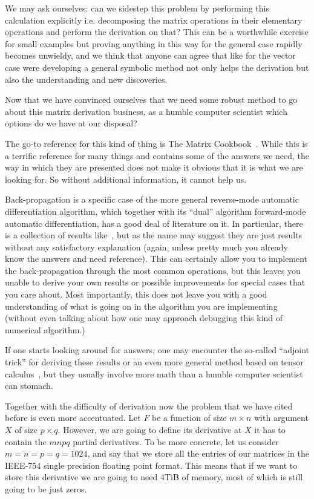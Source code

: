 \documentclass{sapthesis}
\begin{document}
We may ask ourselves: can we sidestep this problem by performing this
calculation explicitly i.e.  decomposing the matrix operations in their
elementary operations and perform the derivation on that? This can be a
worthwhile exercise for small examples but proving anything in this way for the
general case rapidly becomes unwieldy, and we think that anyone can agree that
like for the vector case were developing a general symbolic method not only
helps the derivation but also the understanding and new discoveries.

Now that we have convinced ourselves that we need some robust method to go about
this matrix derivation business, as a humble computer scientist which options do
we have at our disposal?

The go-to reference for this kind of thing is The Matrix
Cookbook~\cite{petersen2012}. While this is a terrific reference for many things
and contains some of the answers we need, the way in which they are presented
does not make it obvious that it is what we are looking for. So without
additional information, it cannot help us.

Back-propagation is a specific case of the more general reverse-mode automatic
differentiation algorithm, which together with its ``dual'' algorithm
forward-mode automatic differentiation, has a good deal of literature on it. In
particular, there is a collection of results like~\cite{giles2008}, but as the
name may suggest they are just results without any satisfactory explanation
(again, unless pretty much you already know the answers and need reference).
This can certainly allow you to implement the back-propagation through the most
common operations, but this leaves you unable to derive your own results or
possible improvements for special cases that you care about. Most importantly,
this does not leave you with a good understanding of what is going on in the
algorithm you are implementing (without even talking about how one may approach
debugging this kind of numerical algorithm.)

If one starts looking around for answers, one may encounter the so-called
``adjoint trick'' for deriving these results or an even more general method
based on tensor calculus~\cite{laue2018, laue2020}, but they usually involve
more math than a humble computer scientist can stomach.

Together with the difficulty of derivation now the problem that we have cited
before is even more accentuated.  Let \(F\) be a function of size \(m \times n\)
with argument \(X\) of size \(p \times q\). However, we are going to define its
derivative at \(X\) it has to contain the \(mnpq\) partial derivatives. To be
more concrete, let us consider \(m=n=p=q=1024\), and say that we store all the
entries of our matrices in the IEEE-754 single precision floating point format.
This means that if we want to store this derivative we are going to need 4TiB of
memory, most of which is still going to be just zeros.
\end{document}
